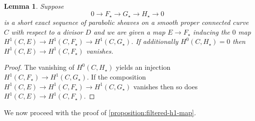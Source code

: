 \documentclass[12 pt]{amsart}
\theoremstyle{plain}
\newtheorem{lemma}[subsubsection]{Lemma}
\theoremstyle{definition}
\theoremstyle{remark}
\numberwithin{equation}{section}
\begin{document}
\begin{lemma}
	\label{lemma:h1-injection}
	Suppose $$0\to F_\star \to G_\star \to H_\star\to 0$$ is a short exact sequence of
	parabolic sheaves on a smooth proper connected curve $C$ with respect to a divisor
	$D$ and we are given a map $E \to F_\star$
	inducing the $0$ map $H^1(C, E) \to H^1(C, F_\star) \to H^1(C,
	G_\star)$.
	If additionally $H^0(C, H_\star) = 0$ then $H^1(C, E) \to H^1(C,F_\star)$ vanishes.
\end{lemma}
\begin{proof}
	The vanishing of $H^0(C, H_\star)$ yields an injection $H^1(C, F_\star)
	\to H^1(C, G_\star)$. If the composition $H^1(C, E) \to H^1(C, F_\star)
	\to H^1(C, G_\star)$ vanishes then so does $H^1(C, E) \to H^1(C,
	F_\star)$.
\end{proof}

We now proceed with the proof of \autoref{proposition:filtered-h1-map}.
\end{document}
